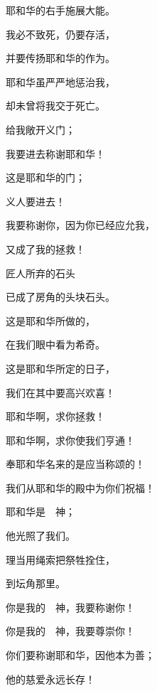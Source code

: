 {\par }{\Q 耶和华的右手施展大能。
\par }{\Q {}我必不致死，仍要存活，
\par }{\Q 并要传扬耶和华的作为。
\par }{\Q {}耶和华虽严严地惩治我，
\par }{\Q 却未曾将我交于死亡。
\par }{\BB \par }{\Q {}给我敞开义门；
\par }{\Q 我要进去称谢耶和华！
\par }{\BB \par }{\Q {}这是耶和华的门；
\par }{\Q 义人要进去！
\par }{\BB \par }{\Q {}我要称谢你，因为你已经应允我，
\par }{\Q 又成了我的拯救！
\par }{\BB \par }{\Q {}匠人所弃的石头
\par }{\Q 已成了房角的头块石头。
\par }{\Q {}这是耶和华所做的，
\par }{\Q 在我们眼中看为希奇。
\par }{\Q {}这是耶和华所定的日子，
\par }{\Q 我们在其中要高兴欢喜！
\par }{\Q {}耶和华啊，求你拯救！
\par }{\Q 耶和华啊，求你使我们亨通！
\par }{\BB \par }{\Q {}奉耶和华名来的是应当称颂的！
\par }{\Q 我们从耶和华的殿中为你们祝福！
\par }{\Q {}耶和华是　神；
\par }{\Q 他光照了我们。
\par }{\Q 理当用绳索把祭牲拴住，
\par }{到坛角那里。
\par }{\BB \par }{\Q {}你是我的　神，我要称谢你！
\par }{\Q 你是我的　神，我要尊崇你！
\par }{\BB \par }{\Q {}你们要称谢耶和华，因他本为善；
\par }{\Q 他的慈爱永远长存！

}
